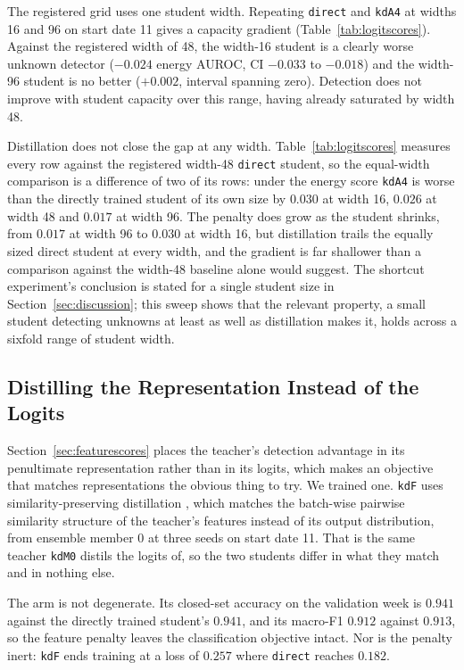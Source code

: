\documentclass[journal]{IEEEtran}
\newcommand{\kd}[1]{\texttt{#1}}
\begin{document}
The registered grid uses one student width. Repeating \kd{direct} and \kd{kdA4} at widths 16 and 96 on start date 11 gives a capacity gradient (Table~\ref{tab:logitscores}). Against the registered width of 48, the width-16 student is a clearly worse unknown detector ($-0.024$ energy AUROC, CI $-0.033$ to $-0.018$) and the width-96 student is no better ($+0.002$, interval spanning zero). Detection does not improve with student capacity over this range, having already saturated by width 48.

Distillation does not close the gap at any width. Table~\ref{tab:logitscores} measures every row against the registered width-48 \kd{direct} student, so the equal-width comparison is a difference of two of its rows: under the energy score \kd{kdA4} is worse than the directly trained student of its own size by $0.030$ at width 16, $0.026$ at width 48 and $0.017$ at width 96. The penalty does grow as the student shrinks, from $0.017$ at width 96 to $0.030$ at width 16, but distillation trails the equally sized direct student at every width, and the gradient is far shallower than a comparison against the width-48 baseline alone would suggest. The shortcut experiment's conclusion is stated for a single student size in Section~\ref{sec:discussion}; this sweep shows that the relevant property, a small student detecting unknowns at least as well as distillation makes it, holds across a sixfold range of student width.

\subsection{Distilling the Representation Instead of the Logits}
\label{sec:featurekd}

Section~\ref{sec:featurescores} places the teacher's detection advantage in its penultimate representation rather than in its logits, which makes an objective that matches representations the obvious thing to try. We trained one. \kd{kdF} uses similarity-preserving distillation \cite{tung2019}, which matches the batch-wise pairwise similarity structure of the teacher's features instead of its output distribution, from ensemble member 0 at three seeds on start date 11. That is the same teacher \kd{kdM0} distils the logits of, so the two students differ in what they match and in nothing else.

The arm is not degenerate. Its closed-set accuracy on the validation week is $0.941$ against the directly trained student's $0.941$, and its macro-F1 $0.912$ against $0.913$, so the feature penalty leaves the classification objective intact. Nor is the penalty inert: \kd{kdF} ends training at a loss of $0.257$ where \kd{direct} reaches $0.182$.
\end{document}
